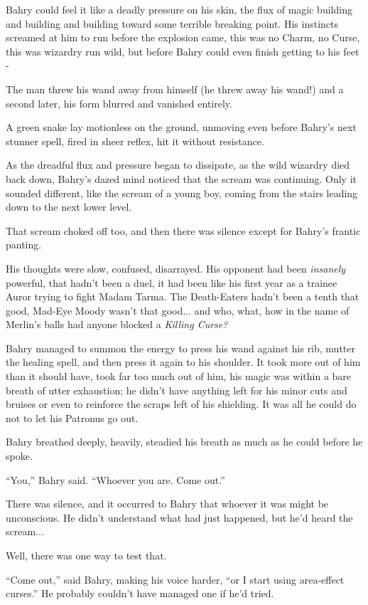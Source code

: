 Bahry could feel it like a deadly pressure on his skin, the flux of magic building and building and building toward some terrible breaking point. His instincts screamed at him to run before the explosion came, this was no Charm, no Curse, this was wizardry run wild, but before Bahry could even finish getting to his feet -

The man threw his wand away from himself (he threw away his wand!) and a second later, his form blurred and vanished entirely.

A green snake lay motionless on the ground, unmoving even before Bahry's next stunner spell, fired in sheer reflex, hit it without resistance.

As the dreadful flux and pressure began to dissipate, as the wild wizardry died back down, Bahry's dazed mind noticed that the scream was continuing. Only it sounded different, like the scream of a young boy, coming from the stairs leading down to the next lower level.

That scream choked off too, and then there was silence except for Bahry's frantic panting.

His thoughts were slow, confused, disarrayed. His opponent had been \emph{insanely} powerful, that hadn't been a duel, it had been like his first year as a trainee Auror trying to fight Madam Tarma. The Death-Eaters hadn't been a tenth that good, Mad-Eye Moody wasn't that good... and who, what, how in the name of Merlin's balls had anyone blocked a \emph{Killing Curse?}

Bahry managed to summon the energy to press his wand against his rib, mutter the healing spell, and then press it again to his shoulder. It took more out of him than it should have, took far too much out of him, his magic was within a bare breath of utter exhaustion; he didn't have anything left for his minor cuts and bruises or even to reinforce the scraps left of his shielding. It was all he could do not to let his Patronus go out.

Bahry breathed deeply, heavily, steadied his breath as much as he could before he spoke.

``You,'' Bahry said. ``Whoever you are. Come out.''

There was silence, and it occurred to Bahry that whoever it was might be unconscious. He didn't understand what had just happened, but he'd heard the scream...

Well, there was one way to test that.

``Come out,'' said Bahry, making his voice harder, ``or I start using area-effect curses.'' He probably couldn't have managed one if he'd tried.

